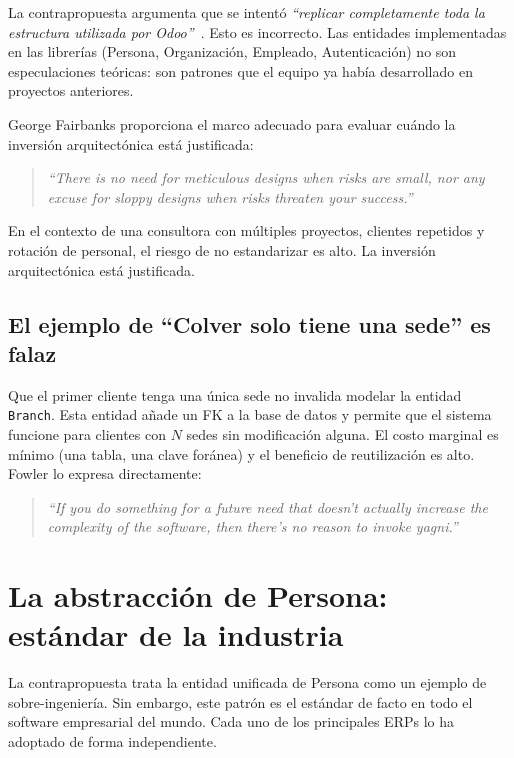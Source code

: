 \documentclass[conference]{IEEEtran}
\begin{document}
La contrapropuesta argumenta que se intent\'o
\textit{``replicar completamente toda la estructura utilizada por
Odoo''}~\cite{araoz2026}. Esto es incorrecto. Las entidades
implementadas en las librer\'ias (Persona, Organizaci\'on,
Empleado, Autenticaci\'on) no son especulaciones te\'oricas: son
patrones que el equipo ya hab\'ia desarrollado en proyectos
anteriores.

George Fairbanks proporciona el marco adecuado para evaluar
cu\'ando la inversi\'on arquitect\'onica est\'a justificada:

\begin{quote}
\textit{``There is no need for meticulous designs when risks are
small, nor any excuse for sloppy designs when risks threaten your
success.''}~\cite{fairbanks2010}
\end{quote}

En el contexto de una consultora con m\'ultiples proyectos,
clientes repetidos y rotaci\'on de personal, el riesgo de no
estandarizar es alto. La inversi\'on arquitect\'onica est\'a
justificada.

\subsection{El ejemplo de ``Colver solo tiene una sede'' es falaz}

Que el primer cliente tenga una \'unica sede no invalida modelar
la entidad \texttt{Branch}. Esta entidad a\~nade un FK a la base
de datos y permite que el sistema funcione para clientes con $N$
sedes sin modificaci\'on alguna. El costo marginal es m\'inimo
(una tabla, una clave for\'anea) y el beneficio de
reutilizaci\'on es alto. Fowler lo expresa directamente:

\begin{quote}
\textit{``If you do something for a future need that doesn't
actually increase the complexity of the software, then there's no
reason to invoke yagni.''}~\cite{fowler2015yagni}
\end{quote}

\section{La abstracci\'on de Persona: est\'andar de la industria}
\label{sec:erps}

La contrapropuesta trata la entidad unificada de Persona como un
ejemplo de sobre-ingenier\'ia. Sin embargo, este patr\'on es el
est\'andar de facto en todo el software empresarial del mundo.
Cada uno de los principales ERPs lo ha adoptado de forma
independiente.
\end{document}
